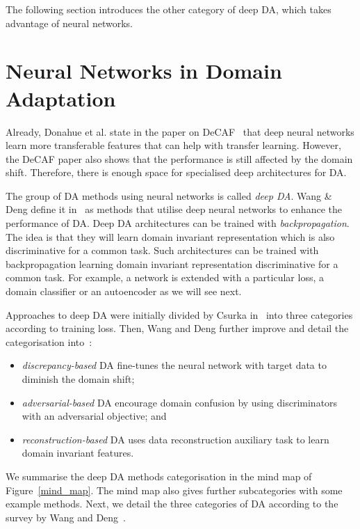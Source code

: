 The following section introduces the other category of deep DA,
which takes advantage of neural networks.

\section{Neural Networks in Domain Adaptation}

Already, Donahue et al. state in the paper on DeCAF~\cite{donahue2014}
that deep neural networks learn more transferable features
that can help with transfer learning.
However, the DeCAF paper also shows
that the performance is still affected by the domain shift.
Therefore, there is enough space for specialised deep architectures for DA.

The group of DA methods using neural networks is called \textit{deep DA}.
Wang \& Deng define it in~\cite{wang2018} as methods that utilise deep neural networks to enhance the performance of DA.
Deep DA architectures can be trained with \textit{backpropagation}.
The idea is that they will learn domain invariant representation
which is also discriminative for a common task.
Such architectures can be trained with backpropagation
learning domain invariant representation discriminative for a common task.
For example, a network is extended with a particular loss, a domain classifier or an autoencoder as we will see next.

Approaches to deep DA were initially divided by Csurka in~\cite{csurka2017} into three categories according to training loss.
Then, Wang and Deng further improve and detail the categorisation into~\cite{wang2018}:

\begin{itemize}
	\item \textit{discrepancy-based} DA fine-tunes the neural network
		with target data to diminish the domain shift;
	\item \textit{adversarial-based} DA encourage domain confusion
		by using discriminators with an adversarial objective; and
	\item \textit{reconstruction-based} DA uses data reconstruction auxiliary task to learn domain invariant features.
\end{itemize}

We summarise the deep DA methods categorisation in the mind map of Figure~\ref{mind_map}.
The mind map also gives further subcategories with some example methods.
Next, we detail the three categories of DA according to the survey by Wang and Deng~\cite{wang2018}.

